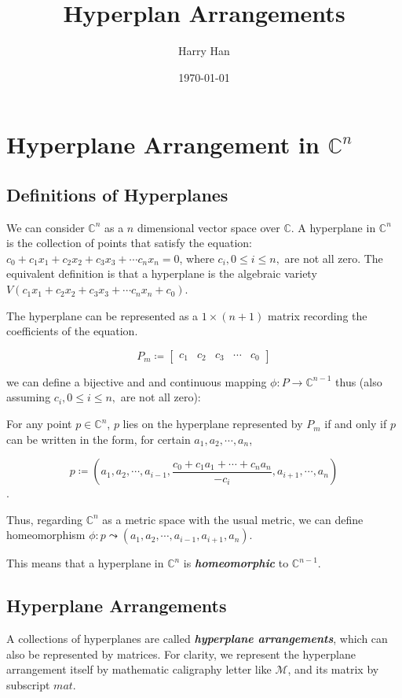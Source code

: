 \documentclass[12pt, a4paper]{article}
\title{Hyperplan Arrangements}
\author{Harry Han}
\date{\today}
\theoremstyle{definition}
\theoremstyle{remark}
\newcommand{\bb}[1]{\mathbb{#1}}
\renewcommand{\emph}[1]{\textit{\textbf{#1}}}
\newcommand{\curly}{\mathrel{\leadsto}}
\begin{document}
\maketitle
\section{Hyperplane Arrangement in $\mathbb{C}^n$}

\subsection{Definitions of Hyperplanes}

We can consider $\bb{C}^n$ as a $n$ dimensional vector space over $\bb{C}$. 
A hyperplane in $\bb{C}^n$ is the collection of points that satisfy the equation: $c_0 + c_1x_1 + c_2x_2 + c_3x_3 + \cdots c_nx_n = 0$, where $c_i, 0 \leq i \leq n, $ are not all zero. The equivalent definition is that a hyperplane is the algebraic variety $V(c_1x_1 + c_2x_2 + c_3x_3 + \cdots c_nx_n + c_0)$. 

The hyperplane can be represented as a $1\times (n+1)$ matrix recording the coefficients of the equation.

$$
P_m \coloneq 
\begin{bmatrix}
	c_1 & c_2 & c_3 & \cdots & c_0
\end{bmatrix}
$$

we can define a bijective and and continuous  mapping $\phi: P \rightarrow  \bb{C}^{n-1}$ thus (also assuming $c_i, 0 \leq i \leq n, $ are not all zero): 

For any point $p \in \bb{C}^n$, $p$ lies on the hyperplane represented by $P_m$ if and only if $p$ can be written in the form, for certain $a_1, a_2, \cdots, a_n$,

$$ p \coloneq (a_1, a_2, \cdots, a_{i-1}, \frac{c_0 + c_1a_1 + \cdots + c_na_n}{-c_i}, a_{i+1}, \cdots, a_n)$$.

Thus, regarding $\mathbb{C}^n$ as a metric space with the usual metric, we can define homeomorphism
$\phi: p \curly (a_1, a_2, \cdots, a_{i-1}, a_{i+1}, a_n)$.

This means that a hyperplane in $\bb{C}^n$ is \emph{homeomorphic} to $\bb{C}^{n-1}$.

\subsection{Hyperplane Arrangements}

A collections of hyperplanes are called \emph{hyperplane arrangements}, which can also be represented by matrices. For clarity, we represent the hyperplane arrangement itself by mathematic caligraphy letter like $\mathcal{M}$, and its matrix by subscript $mat$.
\end{document}
